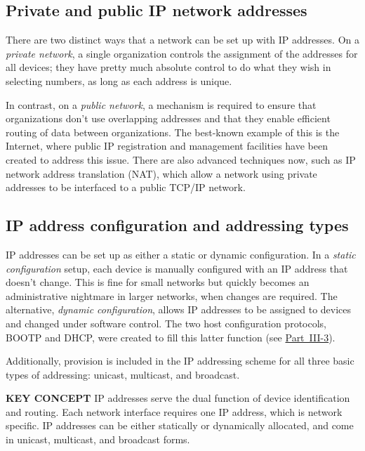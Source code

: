 \subsection{Private and public IP network addresses}

There are two distinct ways that a network can be set up with IP addresses.
On a {\emph{private network}}, a single organization controls the assignment of the addresses for all devices; they have pretty much absolute control to do what they wish in selecting numbers, as long as each address is unique.

In contrast, on a {\emph{public network}}, a mechanism is required to ensure that organizations don't use overlapping addresses and that they enable efficient routing of data between organizations.
The best-known example of this is the Internet, where public IP registration and management facilities have been created to address this issue.
There are also advanced techniques now, such as IP network address translation (NAT), which allow a network using private addresses to be interfaced to a public TCP/IP network.



\subsection{IP address configuration and addressing types}

IP addresses can be set up as either a static or dynamic configuration.
In a {\emph{static configuration}} setup, each device is manually configured with an IP address that doesn't change.
This is fine for small networks but quickly becomes an administrative nightmare in larger networks, when changes are required.
The alternative, {\emph{dynamic configuration}}, allows IP addresses to be assigned to devices and changed under software control.
The two host configuration protocols, BOOTP and DHCP, were created to fill this latter function (see \protect\hyperlink{pt14.html}{Part~III-3}).

Additionally, provision is included in the IP addressing scheme for all three basic types of addressing: unicast, multicast, and broadcast.

{\textbf{KEY CONCEPT}} IP addresses serve the dual function of device identification and routing. Each network interface requires one IP address, which is network specific. IP addresses can be either statically or dynamically allocated, and come in unicast, multicast, and broadcast forms.



